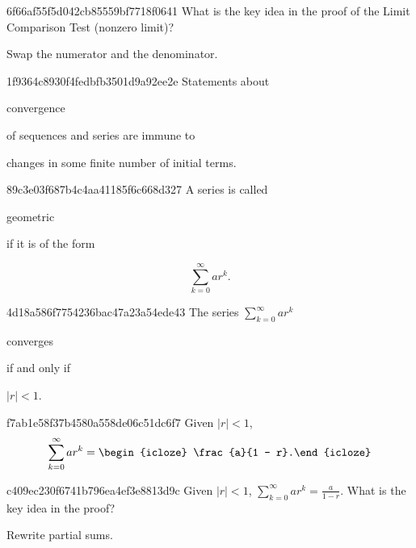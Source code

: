 \begin{note}{6f66af55f5d042cb85559bf7718f0641}
    What is the key idea in the proof of the Limit Comparison Test (nonzero limit)?

    \begin{cloze}{1}
        Swap the numerator and the denominator.
    \end{cloze}
\end{note}

\begin{note}{1f9364c8930f4fedbfb3501d9a92ee2e}
    Statements about \begin{icloze}{2}convergence\end{icloze} of sequences and series are immune to \begin{icloze}{1}changes in some finite number of initial terms.\end{icloze}
\end{note}

\begin{note}{89c3e03f687b4c4aa41185f6c668d327}
    A series is called \begin{icloze}{2}geometric\end{icloze} if it is of the form
    \begin{icloze}{1}
        \[
            \sum_{k=0}^{\infty} ar^{k}.
        \]
    \end{icloze}
\end{note}

\begin{note}{4d18a586f7754236bac47a23a54ede43}
    The series \({ \sum_{k=0}^{\infty} ar^{k} }\) \begin{icloze}{2}converges\end{icloze} \begin{icloze}{3}if and only if\end{icloze} \begin{icloze}{1}\({ \left\lvert r \right\rvert < 1 }\).\end{icloze}
\end{note}

\begin{note}{f7ab1e58f37b4580a558de06c51dc6f7}
    Given \({ \left\lvert r \right\rvert < 1 }\),
    \[
        \sum_{k=0}^{\infty} ar^{k} = \begin{icloze}{1}\frac{a}{1 - r}.\end{icloze}
    \]
\end{note}

\begin{note}{c409ec230f6741b796ea4ef3e8813d9c}
    Given \({ \left\lvert r \right\rvert < 1 }\), \({ \sum_{k=0}^{\infty} ar^{k} = \frac{a}{1 - r} }\).
    What is the key idea in the proof?

    \begin{cloze}{1}
        Rewrite partial sums.
    \end{cloze}
\end{note}

